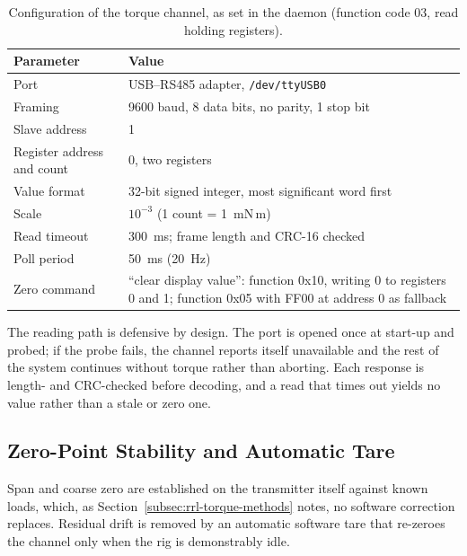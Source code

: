 \begin{table}[htbp]
    \centering
    \caption[Serial and register configuration of the torque channel]{Configuration of the torque channel, as set in the daemon (function code 03, read holding registers).}
    \label{tab:modbus}
    \small
    \begin{tabular}{@{}ll@{}}
        \toprule
        Parameter & Value \\
        \midrule
        Port & USB--RS485 adapter, \texttt{/dev/ttyUSB0} \\
        Framing & 9600 baud, 8 data bits, no parity, 1 stop bit \\
        Slave address & 1 \\
        Register address and count & 0, two registers \\
        Value format & 32-bit signed integer, most significant word first \\
        Scale & $10^{-3}$ (1 count = 1~mN\,m) \\
        Read timeout & 300~ms; frame length and CRC-16 checked \\
        Poll period & 50~ms (20~Hz) \\
        Zero command & ``clear display value'': function 0x10, writing 0 to registers 0 and 1; function 0x05 with FF00 at address 0 as fallback~\citep{atomodbus2026} \\
        \bottomrule
    \end{tabular}
\end{table}

The reading path is defensive by design. The port is opened once at start-up and probed; if the probe fails, the channel reports itself unavailable and the rest of the system continues without torque rather than aborting. Each response is length- and CRC-checked before decoding, and a read that times out yields no value rather than a stale or zero one.

\subsection{Zero-Point Stability and Automatic Tare}
\label{subsec:agit-tare}

Span and coarse zero are established on the transmitter itself against known loads, which, as Section~\ref{subsec:rrl-torque-methods} notes, no software correction replaces. Residual drift is removed by an automatic software tare that re-zeroes the channel only when the rig is demonstrably idle.


